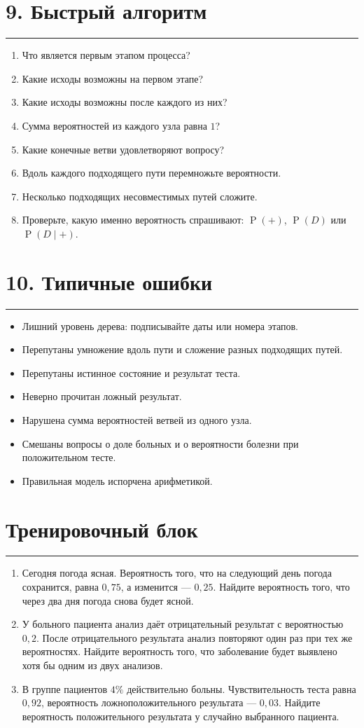 \documentclass[a4paper,12pt]{article}
\newcommand{\sectionrule}{\vspace{-0.4em}\textcolor{accent}{\rule{\linewidth}{0.7pt}}\vspace{0.4em}}
\newcommand{\prob}[1]{\operatorname{P}\!\left(#1\right)}
\begin{document}
\section*{9. Быстрый алгоритм}
\sectionrule
\begin{enumerate}
\item Что является первым этапом процесса?
\item Какие исходы возможны на первом этапе?
\item Какие исходы возможны после каждого из них?
\item Сумма вероятностей из каждого узла равна \(1\)?
\item Какие конечные ветви удовлетворяют вопросу?
\item Вдоль каждого подходящего пути перемножьте вероятности.
\item Несколько подходящих несовместимых путей сложите.
\item Проверьте, какую именно вероятность спрашивают: \(\prob{+}\), \(\prob{D}\) или \(\prob{D\mid +}\).
\end{enumerate}

\section*{10. Типичные ошибки}
\sectionrule
\begin{itemize}
\item Лишний уровень дерева: подписывайте даты или номера этапов.
\item Перепутаны умножение вдоль пути и сложение разных подходящих путей.
\item Перепутаны истинное состояние и результат теста.
\item Неверно прочитан ложный результат.
\item Нарушена сумма вероятностей ветвей из одного узла.
\item Смешаны вопросы о доле больных и о вероятности болезни при положительном тесте.
\item Правильная модель испорчена арифметикой.
\end{itemize}

\newpage
\section*{Тренировочный блок}
\sectionrule
\begin{enumerate}
\item Сегодня погода ясная. Вероятность того, что на следующий день погода сохранится, равна \(0{,}75\), а изменится --- \(0{,}25\). Найдите вероятность того, что через два дня погода снова будет ясной.
\item У больного пациента анализ даёт отрицательный результат с вероятностью \(0{,}2\). После отрицательного результата анализ повторяют один раз при тех же вероятностях. Найдите вероятность того, что заболевание будет выявлено хотя бы одним из двух анализов.
\item В группе пациентов \(4\%\) действительно больны. Чувствительность теста равна \(0{,}92\), вероятность ложноположительного результата --- \(0{,}03\). Найдите вероятность положительного результата у случайно выбранного пациента.
\end{enumerate}
\end{document}
